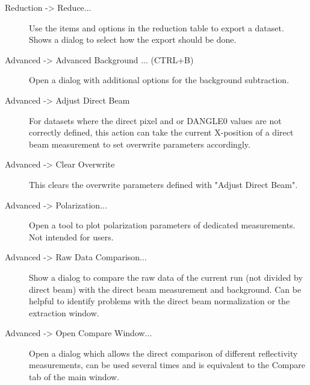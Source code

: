 \begin{description}
    \item[{ Reduction -> Reduce...}] Use the items and options in the reduction table to export a dataset. Shows a dialog to select how the export should be done.

   \item[{Advanced -> Advanced Background ... (CTRL+B)}] Open a dialog with additional options for the background subtraction.
   \item[{ Advanced -> Adjust Direct Beam}] For datasets where the direct pixel and or DANGLE0 values are not correctly defined, this action can take the current X-position of a direct beam measurement to set overwrite parameters accordingly.
   \item[{ Advanced -> Clear Overwrite}] This clears the overwrite parameters defined with "Adjust Direct Beam".
   
   \item[{ Advanced -> Polarization...}] Open a tool to plot polarization parameters of dedicated measurements. Not intended for users.
   \item[{ Advanced -> Raw Data Comparison...}] Show a dialog to compare the raw data of the current run (not divided by direct beam) with the direct beam measurement and background. Can be helpful to identify problems with the direct beam normalization or the extraction window.
   \item[{ Advanced -> Open Compare Window...}] Open a dialog which allows the direct comparison of different reflectivity measurements, can be used several times and is equivalent to the Compare tab of the main window.


\end{description}
